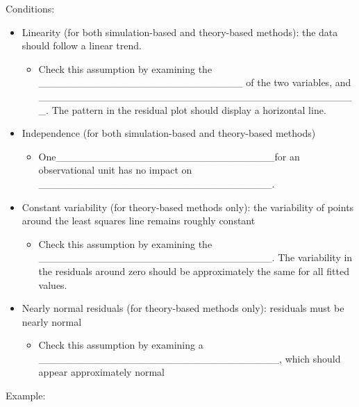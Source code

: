 \documentclass[
]{report}
\providecommand{\tightlist}{%
  \setlength{\itemsep}{0pt}\setlength{\parskip}{0pt}}
\begin{document}
Conditions:


\begin{itemize}
\item
  Linearity (for both simulation-based and theory-based methods): the data should follow a linear trend.

  \begin{itemize}
  \tightlist
  \item
    Check this assumption by examining the \_\_\_\_\_\_\_\_\_\_\_\_\_\_\_\_\_\_\_\_\_\_\_\_\_\_\_\_ of the two variables, and \_\_\_\_\_\_\_\_\_\_\_\_\_\_\_\_\_\_\_\_\_\_\_\_\_\_\_\_\_\_\_\_\_\_\_\_\_\_\_\_\_\_\_\_. The pattern in the residual plot should display a horizontal line.
  \end{itemize}
\item
  Independence (for both simulation-based and theory-based methods)

  \begin{itemize}
  \tightlist
  \item
    One\_\_\_\_\_\_\_\_\_\_\_\_\_\_\_\_\_\_\_\_\_\_\_\_\_\_\_\_\_\_for an observational unit has no impact on \_\_\_\_\_\_\_\_\_\_\_\_\_\_\_\_\_\_\_\_\_\_\_\_\_\_\_\_\_\_\_\_.
  \end{itemize}
\item
  Constant variability (for theory-based methods only): the variability of points around the least squares line remains roughly constant

  \begin{itemize}
  \tightlist
  \item
    Check this assumption by examining the \_\_\_\_\_\_\_\_\_\_\_\_\_\_\_\_\_\_\_\_\_\_\_\_\_\_\_\_\_\_\_\_. The variability in the residuals around zero should be approximately the same for all fitted values.
  \end{itemize}
\item
  Nearly normal residuals (for theory-based methods only): residuals must be nearly normal

  \begin{itemize}
  \tightlist
  \item
    Check this assumption by examining a \_\_\_\_\_\_\_\_\_\_\_\_\_\_\_\_\_\_\_\_\_\_\_\_\_\_\_\_\_\_\_\_\_, which should appear approximately normal
  \end{itemize}
\end{itemize}


Example:
\end{document}
